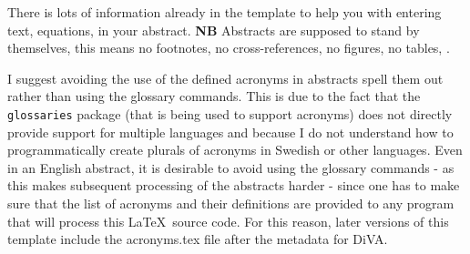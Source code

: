\documentclass[main.tex]{subfiles}
\begin{document}
There is lots of information already in the template to help you with entering text, equations, \etc in your abstract. \textbf{NB} Abstracts are supposed to stand by themselves, this means no footnotes, no cross-references, no figures, no tables, \etc.

I suggest avoiding the use of the defined acronyms in abstracts \ie spell them out rather than using the glossary commands. This is due to the fact that the \texttt{glossaries} package (that is being used to support acronyms) does not directly provide support for multiple languages and because I do not understand how to programmatically create plurals of acronyms in Swedish or other languages. Even in an English abstract, it is desirable to avoid using the glossary commands - as this makes subsequent processing of the abstracts harder - since one has to make sure that the list of acronyms and their definitions are provided to any program that will process this \LaTeX\  source code. For this reason, later versions of this template include the acronyms.tex file after the metadata for DiVA.
\end{document}
